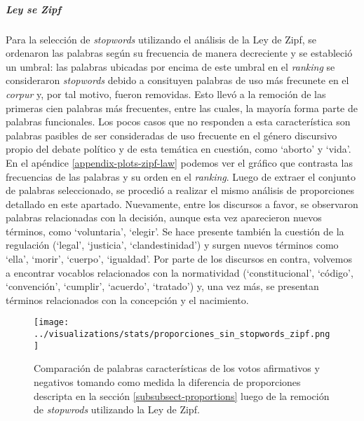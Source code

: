 \subparagraph{Ley se Zipf}
Para la selección de \textit{stopwords} utilizando el análisis de la Ley de Zipf,
se ordenaron las palabras según su frecuencia de manera decreciente y se estableció
un umbral: las palabras ubicadas por encima de este umbral en el \textit{ranking}
se consideraron \textit{stopwords} debido a consituyen palabras de uso más
frecunete en el \textit{corpur} y, por tal motivo, fueron removidas.
Esto llevó a la remoción de las primeras cien palabras más frecuentes, entre 
las cuales, la mayoría forma parte de palabras funcionales.
Los pocos casos que no responden a esta característica son palabras pasibles de
ser consideradas de uso frecuente en el género discursivo propio del debate político
y de esta temática en cuestión, como `aborto' y `vida'.
En el apéndice \ref{appendix-plots-zipf-law} podemos ver el gráfico que contrasta
las frecuencias de las palabras y su orden en el \textit{ranking}.
Luego de extraer el conjunto de palabras seleccionado, se procedió a realizar el
mismo análisis de proporciones detallado en este apartado. Nuevamente, entre
los discursos a favor, se observaron palabras relacionadas con la decisión, aunque
esta vez aparecieron nuevos términos, como `voluntaria', `elegir'. Se hace presente
también la cuestión de la regulación (`legal', `justicia', `clandestinidad') y
surgen nuevos términos como `ella', `morir', `cuerpo', `igualdad'.
Por parte de los discursos en contra, volvemos a encontrar vocablos relacionados
con la normatividad (`constitucional', `código', `convención', `cumplir', 
`acuerdo', `tratado') y, una vez más, se presentan términos relacionados
con la concepción y el nacimiento.

\begin{figure}[h!]
    \centering
    \texttt{[image: ../visualizations/stats/proporciones\_sin\_stopwords\_zipf.png]}
    \caption{Comparación de palabras características de los votos afirmativos y
    negativos tomando como medida la diferencia de proporciones descripta
    en la sección \ref{subsubsect-proportions} luego de la remoción de
    \textit{stopwrods} utilizando la Ley de Zipf.}
    \label{fig-statistics-proportions-zipf}
\end{figure}

